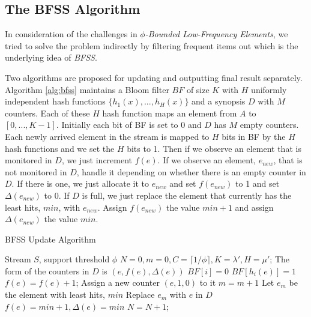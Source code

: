 \documentclass[conference]{IEEEtran}
\begin{document}
\subsection{The BFSS Algorithm}\label{sec:bfss}
In consideration of the challenges in $\phi$\emph{-Bounded Low-Frequency Elements}, we tried to solve the problem indirectly by filtering frequent items out which is the underlying idea of \emph{BFSS}.\par
Two algorithms are proposed for updating and outputting final result separately. Algorithm \ref{alg:bfss} maintains a Bloom filter $BF$ of size $K$ with $H$ uniformly independent hash functions $\{h_1(x),...,h_H(x)\}$ and a synopsis $D$ with $M$ counters. Each of these $H$ hash function maps an element from $A$ to $[0,...,K-1]$. Initially each bit of BF is set to 0 and $D$ has $M$ empty counters. Each newly arrived element in the stream is mapped to $H$ bits in BF by the $H$ hash functions and we set the $H$ bits to 1. Then if we observe an element that is monitored in $D$, we just increment $f(e)$. If we observe an element, $e_{new}$, that is not monitored in $D$, handle it depending on whether there is an empty counter in $D$. If there is one, we just allocate it to $e_{new}$ and set $f(e_{new})$ to 1 and set $\Delta(e_{new})$ to 0. If $D$ is full, we just replace the element that currently has the least hits, $min$, with $e_{new}$. Assign $f(e_{new})$ the value $min+1$ and assign $\Delta(e_{new})$ the value $min$.\par

\begin{algorithm}[h]
	\caption{BFSS Update Algorithm}
	\label{alg:bfss}
\begin{algorithmic}[1]
	\REQUIRE Stream $S$, support threshold $\phi$
	\STATE $N=0,m=0,C=\lceil 1/\phi\rceil,K=\lambda',H=\mu'$; 
	\STATE The form of the counters in $D$ is $(e,f(e),\Delta(e))$
	\STATE $BF[i]=0$
	\ENDFOR
	\STATE $BF[h_i(e)]=1$
	\ENDFOR
	\STATE $f(e)=f(e)+1$;
	\STATE Assign a new counter $(e,1,0)$ to it
	\STATE $m=m+1$
	\ELSE
	\STATE Let $e_m$ be the element with least hits, $min$
	\STATE Replace $e_m$ with $e$ in $D$
	\STATE $f(e)=min+1,\Delta(e)=min$
	\ENDIF
	\STATE $N=N+1$;
	\ENDFOR
\end{algorithmic}
\end{algorithm}
\end{document}
